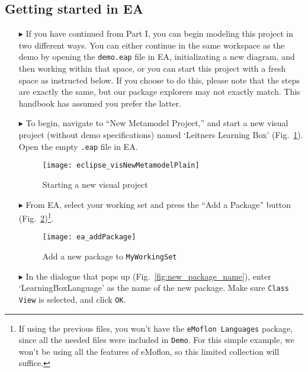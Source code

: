\subsection{Getting started in EA}
\visHeader
\hypertarget{static:starting vis}{}

\begin{itemize}
\item[$\blacktriangleright$]  If you have continued from Part I, you can begin modeling this project in two different ways. You can either continue in the same
workspace as the demo by opening the \texttt{demo.eap} file in EA, initializating a new diagram, and then working within that space, or you can start this
project with a fresh space as instructed below. If you choose to do this, please note that the steps are exactly the same, but our package explorers may not
exactly match. This handbook has assumed you prefer the latter.

\item[$\blacktriangleright$]  To begin, navigate to ``New Metamodel Project,'' and start a new visual project (without demo specifications) named `Leitners
Learning Box' (Fig.~\ref{fig:new_visModel}). Open the empty \texttt{.eap} file in EA.

\begin{figure}[htbp]
	\centering
  \texttt{[image: eclipse\_visNewMetamodelPlain]}
	\caption{Starting a new visual project}
	\label{fig:new_visModel}
\end{figure}

\newpage

\item[$\blacktriangleright$] From EA, select your working set and press the ``Add a Package'' button (Fig.~\ref{fig:new_package})\footnote{If using the previous
files, you won't have the \texttt{eMoflon Languages} package, since all the needed files were included in \texttt{Demo}. For this simple example, we won't be
using all the features of eMoflon, so this limited collection will suffice.}.

\begin{figure}[htbp]
	\centering
  \texttt{[image: ea\_addPackage]}
	\caption{Add a new package to \texttt{MyWorkingSet}}
	\label{fig:new_package}
	\vspace{0.5cm}
\end{figure}

\vspace{1.0cm}

\item[$\blacktriangleright$] In the dialogue that pops up (Fig.~\ref{fig:new_package_name}), enter `Learning\-Box\-Language' as the name of the new package.
Make sure \texttt{Class View} is selected, and click \texttt{OK}.


\end{itemize}
